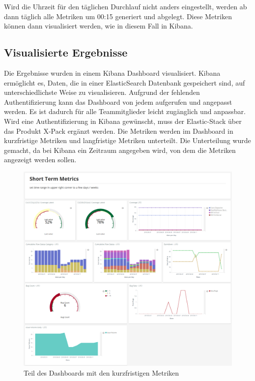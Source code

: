 Wird die Uhrzeit für den täglichen Durchlauf nicht anders eingestellt, werden ab dann täglich alle Metriken um 00:15 generiert und abgelegt.
Diese Metriken können dann visualisiert werden, wie in diesem Fall in Kibana.

\clearpage
\subsection{Visualisierte Ergebnisse}

Die Ergebnisse wurden in einem Kibana Dashboard visualisiert.
Kibana ermöglicht es, Daten, die in einer ElasticSearch Datenbank gespeichert sind, auf unterschiedlichste Weise zu visualisieren.
Aufgrund der fehlenden Authentifizierung kann das Dashboard von jedem aufgerufen und angepasst werden.
Es ist dadurch für alle Teammitglieder leicht zugänglich und anpassbar.
Wird eine Authentifizierung in Kibana gewünscht, muss der Elastic-Stack über das Produkt X-Pack ergänzt werden.
Die Metriken werden im Dashboard in kurzfristige Metriken und langfristige Metriken unterteilt.
Die Unterteilung wurde gemacht, da bei Kibana ein Zeitraum angegeben wird, von dem die Metriken angezeigt werden sollen.

\begin{savenotes}
    \begin{figure}[H] 
        \centering
            \includegraphics[width=1.0\textwidth]{img/dashboard-short-term.png}
        \caption{Teil des Dashboards mit den kurzfristigen Metriken}\label{fig:dashboard-short-term}
    \end{figure}
\end{savenotes}

